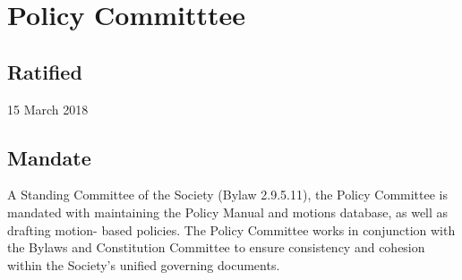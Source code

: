\section{Policy Committtee}
\subsection{Ratified}
15 March 2018
\subsection{Mandate}
A Standing Committee of the Society (Bylaw 2.9.5.11), the Policy Committee is mandated with maintaining the Policy Manual and motions database, as well as drafting motion- based policies. The Policy Committee works in conjunction with the Bylaws and Constitution Committee to ensure consistency and cohesion within the Society's unified governing documents.

